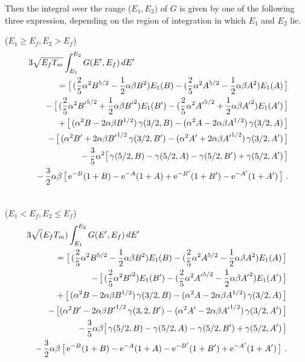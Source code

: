 \noindent
Then the integral over the range ($E_1,E_2)$ of $G$ is given by one of the
following three expression, depending on the region of integration
in which $E_1$ and $E_2$ lie.

\footnotesize
\noindent{}  ($E_1 \ge E_f, E_2 > E_f$)
\begin{eqnarray}
  \lefteqn{3\sqrt{E_fT_m} \int_{E_1}^{E_2} G(E',E_f)\,dE'}\nonumber\\
  & & =\bigl[\, ({2\over 5}\alpha^2 B^{5/2}-{1\over 2}\alpha \beta B^2)
      E_1(B)-({2\over 5}\alpha^2 A^{5/2}-{1\over 2}\alpha \beta A^2)
      E_1(A) \,\bigr]\nonumber\\
  & & -\,\bigl[\,({2\over 5}\alpha^2 {B'}^{5/2}+{1\over 2}\alpha\beta {B'}^2 )
      E_1(B')-({2\over 5}\alpha^2 {A'}^{5/2}+{1\over 2}\alpha \beta {A'}^2 )
      E_1(A') \,\bigr]\nonumber\\
  & & +\,\bigl[\, (\alpha^2 B-2\alpha \beta B^{1/2})\,\gamma(3/2,B)
      -(\alpha^2 A-2 \alpha \beta A^{1/2})\,\gamma (3/2,A) \,\bigr]
      \nonumber\\
  & & -\,\bigl[\, (\alpha^2 B'+2\alpha\beta {B'}^{1/2}\,\gamma(3/2,B')
      -(\alpha^2 A'+2\alpha\beta {A'}^{1/2})\,\gamma(3/2,A')\, \bigr]
      \nonumber\\
  & & -\,{3\over 5} \alpha^2 \bigl[\, \gamma(5/2,B)-\gamma(5/2,A)
      -\gamma(5/2,B')+\gamma(5/2,A') \,\bigr]\nonumber\\
  & & -\,{3\over 2}\alpha\beta\, \bigl[\, {\rm e}^{-B}(1+B)
      -{\rm e}^{-A}(1+A)+{\rm e}^{-B'}(1+B')-{\rm e}^{-A'}(1+A')
      \,\bigr] \,\,.\nonumber\\
  \mbox{ }
\end{eqnarray}

\noindent{}  ($E_1 < E_f, E_2 \le E_f$)
  \begin{eqnarray}
  \lefteqn{3 \sqrt(E_fT_m) \int_{E_1}^{E_2} G(E',E_f)\,dE'}\nonumber\\
  & & =\bigl[\, ({2\over 5}\alpha^2 B^{5/2}-{1\over 2}\alpha\beta B^2)E_1(B)
      -({2\over 5}\alpha^2 A^{5/2}-{1\over 2}\alpha\beta A^2)E_1(A)
      \,\bigr]\nonumber\\
  & & -\,\bigl[\, ({2\over 5}\alpha^2 {B'}^2)E_1(B')-({2\over 5}\alpha^2
      {A'}^{5/2}-{1\over 2}\alpha\beta {A'}^2)E_1(A') \,\bigr]
      \nonumber\\
  & &+\,\bigl[\, (\alpha^2 B-2\alpha\beta B^{1/2})\,\gamma(3/2,B)
      -(\alpha^2 A-2\alpha\beta A^{1/2})\,\gamma(3/2,A) \,\bigr]
      \nonumber\\
  & & -\,\bigl[ (\alpha^2 B'-2\alpha\beta {B'}^{1/2}\,\gamma(3,2,B')
      -(\alpha^2 A'-2\alpha\beta {A'}^{1/2})\,\gamma(3/2,A') \,\bigr]
      \nonumber\\
  & & -\,{3\over 5}\alpha\beta\bigl[\, \gamma(5/2,B)-\gamma(5/2,A)
      -\gamma(5/2,B')+\gamma(5/2,A') \,\bigr]\nonumber\\
  & & -\,{3\over 2}\alpha\beta\,\bigl[\, {\rm e}^{-B}(1+B)
      -{\rm e}^{-A}(1+A)-{\rm e}^{-B'}(1+B')+{\rm e}^{-A'}(1+A')\,\bigr]\,\,.
      \nonumber\\
  & &\mbox{ }
\end{eqnarray}

